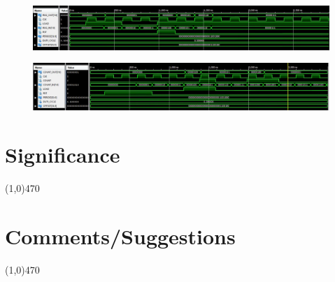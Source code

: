 \documentclass[12pt]{article}
\begin{document}
\begin{figure}[h]
    \centering
	\includegraphics[scale=.34]{reg_tb_wave.png}
	\caption{}
\end{figure}

\begin{figure}[h]
    \centering
	\includegraphics[scale=.34]{counter_tb_wave.png}
	\caption{}
\end{figure}


	\newpage
\section{Significance} \vspace{-.7cm} \line(1,0){470}
	\paragraph{}


 \section{Comments/Suggestions}\vspace{-.7cm} \line(1,0){470}
 	\paragraph{}
		
\end{document}
